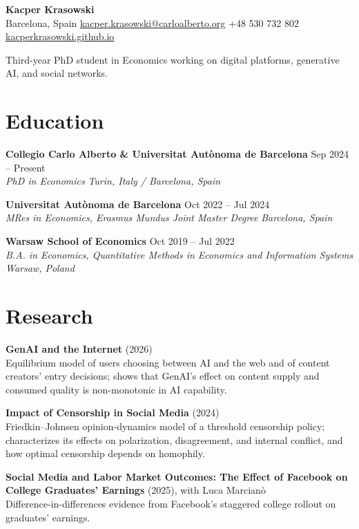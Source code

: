 \documentclass[11pt,a4paper]{article}
\newcommand{\role}[4]{%
    \textbf{#1} \hfill #2\\
    \textit{#3} \hfill \textit{#4}\par
}
\begin{document}
\begin{center}
    {\LARGE\textbf{Kacper Krasowski}}\\[0.35em]
    Barcelona, Spain \textbar{}
    \href{mailto:kacper.krasowski@carloalberto.org}{kacper.krasowski@carloalberto.org} \textbar{}
    +48 530 732 802 \textbar{}
    \href{https://kacperkrasowski.github.io/}{kacperkrasowski.github.io}
\end{center}

\vspace{0.3em}
Third-year PhD student in Economics working on digital platforms, generative AI, and social networks.

\section*{Education}

\role{Collegio Carlo Alberto \& Universitat Aut\`onoma de Barcelona}{Sep 2024 -- Present}{PhD in Economics}{Turin, Italy / Barcelona, Spain}
\vspace{0.3em}
\role{Universitat Aut\`onoma de Barcelona}{Oct 2022 -- Jul 2024}{MRes in Economics, Erasmus Mundus Joint Master Degree}{Barcelona, Spain}
\vspace{0.3em}
\role{Warsaw School of Economics}{Oct 2019 -- Jul 2022}{B.A. in Economics, Quantitative Methods in Economics and Information Systems}{Warsaw, Poland}

\section*{Research}

\textbf{GenAI and the Internet} (2026)\\
Equilibrium model of users choosing between AI and the web and of content creators' entry decisions; shows that GenAI's effect on content supply and consumed quality is non-monotonic in AI capability.

\vspace{0.35em}
\textbf{Impact of Censorship in Social Media} (2024)\\
Friedkin--Johnsen opinion-dynamics model of a threshold censorship policy; characterizes its effects on polarization, disagreement, and internal conflict, and how optimal censorship depends on homophily.

\vspace{0.35em}
\textbf{Social Media and Labor Market Outcomes: The Effect of Facebook on College Graduates' Earnings} (2025), with Luca Marcian\`o\\
Difference-in-differences evidence from Facebook's staggered college rollout on graduates' earnings.
\end{document}
